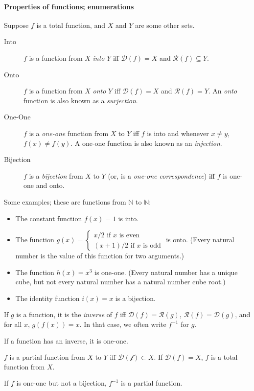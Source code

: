 \paragraph{Properties of functions; enumerations}

Suppose $f$ is a total function, and $X$ and $Y$ are some other sets. 

\begin{definition}
\begin{description}
	\item [Into] $f$ is a function from $X$ \emph{into} $Y$ iff $\mathcal{D}(f) = X$ and $\mathcal{R}(f)\subseteq Y$.
	\item [Onto] $f$ is a function from $X$ \emph{onto} $Y$ iff $\mathcal{D}(f) = X$ and $\mathcal{R}(f) = Y$. An \emph{onto} function is also known as a \emph{surjection}.
	\item [One-One] $f$ is a \emph{one-one} function from $X$ to $Y$ iff $f$ is into and whenever $x\neq y$, $f(x)\neq f(y)$. A one-one function is also known as an \emph{injection}.
	\item [Bijection] $f$ is a \emph{bijection} from $X$ to $Y$ (or, is a \emph{one-one correspondence}) iff $f$ is one-one and onto.
\end{description}
\end{definition}
Some examples; these are functions from $\mathbb{N}$ to $\mathbb{N}$: \begin{itemize}
	\item The constant function $f(x) = 1$ is into.
	\item The function $g(x) = \begin{cases}
		x/2 \text{ if $x$ is even}\\
		(x+1)/2 \text{ if $x$ is odd} 
	\end{cases}$ is onto. (Every natural number is the value of this function for two arguments.)
	\item The function $h(x)=x^3$ is one-one. (Every natural number has a unique cube, but not every natural number has a natural number cube root.)
 	\item The identity function $i(x) = x$ is a bijection.
\end{itemize}

\begin{definition}[Inverse] If $g$ is a function, it is the \emph{inverse} of $f$ iff  $\mathcal{D}(f)=\mathcal{R}(g)$, $\mathcal{R}(f)=\mathcal{D}(g)$, and for all $x$, $g(f(x))=x$. In that case, we often write $f^{-1}$ for $g$.
 \end{definition} 
\begin{theorem}
	If a function has an inverse, it is one-one.
\end{theorem}
\begin{definition}
 $f$ is a partial function from $X$ to $Y$ iff $\mathcal{D(f)} \subset X$. If $\mathcal{D}(f)=X$, $f$ is a total function from $X$.
\end{definition}
\begin{theorem}
	If $f$ is one-one but not a bijection, $f^{-1}$ is a partial function.
\end{theorem}


